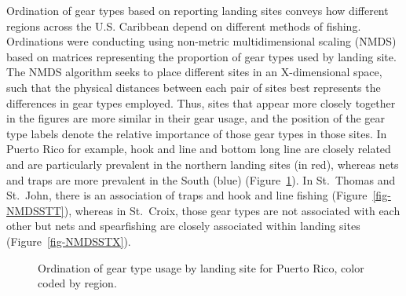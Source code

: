 \documentclass[
  letterpaper,
  oneside,
  open=any]{scrbook}
\begin{document}
Ordination of gear types based on reporting landing sites conveys how
different regions across the U.S. Caribbean depend on different methods
of fishing. Ordinations were conducting using non-metric
multidimensional scaling (NMDS) based on matrices representing the
proportion of gear types used by landing site. The NMDS algorithm seeks
to place different sites in an X-dimensional space, such that the
physical distances between each pair of sites best represents the
differences in gear types employed. Thus, sites that appear more closely
together in the figures are more similar in their gear usage, and the
position of the gear type labels denote the relative importance of those
gear types in those sites. In Puerto Rico for example, hook and line and
bottom long line are closely related and are particularly prevalent in
the northern landing sites (in red), whereas nets and traps are more
prevalent in the South (blue) (Figure~\ref{fig-NMDSPR}). In St.~Thomas
and St.~John, there is an association of traps and hook and line fishing
(Figure~\ref{fig-NMDSSTT}), whereas in St.~Croix, those gear types are
not associated with each other but nets and spearfishing are closely
associated within landing sites (Figure~\ref{fig-NMDSSTX}).

\begin{figure}


\caption{\label{fig-NMDSPR}Ordination of gear type usage by landing site
for Puerto Rico, color coded by region.}

\end{figure}%
\end{document}
